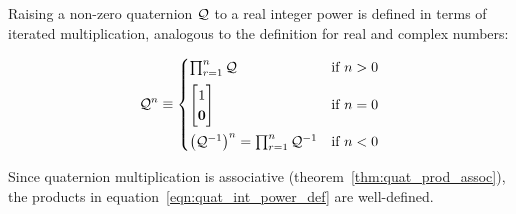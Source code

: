 Raising a non-zero quaternion $\mathcal{Q}$ to a real integer power
is defined in terms of iterated multiplication,
analogous to the definition for real and complex numbers:
\begin{definition}\label{def:quat_int_power}
\begin{equation}
\quat Q^n \equiv
\begin{cases}
  \prod_{r=1}^n \quat Q
    & \text{if $n>0$} \\[5pt]
  \quatsv 1 {\vect 0}
    & \text{if $n =0$} \\[12pt]
  \left(\quat Q^{-1}\right)^n = \prod_{r=1}^n \quat Q^{-1}
    & \text{if $n<0$}
\end{cases}\label{eqn:quat_int_power_def}
\end{equation}
\end{definition}
Since quaternion multiplication is associative
(theorem~\ref{thm:quat_prod_assoc}),
the products in equation~\eqref{eqn:quat_int_power_def} are well-defined.

